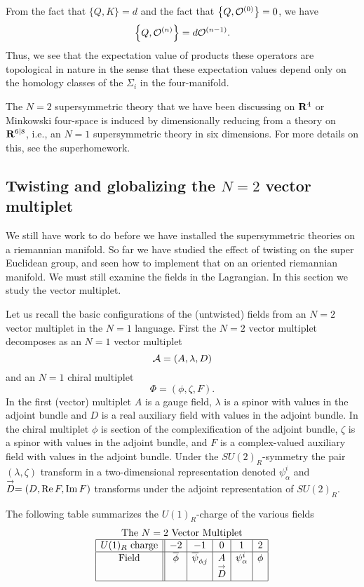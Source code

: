 \documentclass[10pt]{article}
\def\ov{\overline}
\begin{document}
{}From the fact that $\{Q,K\}=d$ and the fact that $\left\{Q,{\cal
O}^{(0)}\right\}=0$,  we have
$$\left\{Q,{\cal O}^{(n)}\right\}=d{\cal O}^{(n-1)}.$$
Thus, we see that the expectation value of
products these operators are topological in nature in the sense
that these expectation values 
depend only on the homology classes of the $\Sigma_i$ in the
four-manifold. 

The $N=2$ supersymmetric  theory that we have been discussing on ${\bf
R}^4$ or Minkowski four-space is induced by dimensionally reducing
from  a theory on ${\bf R}^{6|8}$, i.e., an $N=1$ supersymmetric
theory in six dimensions.  For more details on this, see the
superhomework. 


\subsection{Twisting and globalizing the $N=2$ vector multiplet}

We still have work to do before we have installed the supersymmetric
theories on a riemannian manifold.  So far we have studied the effect
of twisting on the super Euclidean group, and seen how to implement
that on an oriented riemannian manifold.  We must still examine the
fields in the Lagrangian. In this section we study the vector multiplet.


Let us recall the basic configurations of the (untwisted) fields from
an $N=2$ 
vector multiplet in the $N=1$ language. 
First the $N=2$ vector multiplet decomposes as an $N=1$ vector
multiplet 
$${\cal A}=(A,\lambda,D)$$
and an $N=1$ chiral multiplet 
$$\Phi=(\phi,\zeta,F).$$
In the first (vector) multiplet $A$ is a gauge field, $\lambda$ is a spinor
with values in the adjoint bundle and $D$ is a real
auxiliary field with values in the adjoint bundle.
In the chiral multiplet $\phi$ is section of the complexification of
the adjoint bundle, $\zeta$ is a spinor with values in the adjoint
bundle, and $F$ is a complex-valued auxiliary field with values in the
adjoint bundle.
Under the $SU(2)_R$-symmetry the pair $(\lambda,\zeta)$ transform in a
two-dimensional representation denoted $\psi_\alpha^i$ and $\buildrel
\rightarrow\over D = 
(D,{\rm Re}\,F,{\rm Im}\,F)$ transforms under the 
adjoint representation of $SU(2)_R$.

The following table summarizes the $U(1)_R$-charge of the various
fields
$$\begin{array}{|c||c|c|c|c|c|}
\multicolumn{6}{c} {{\rm The} \ N=2\ {\rm Vector\ Multiplet}} \\
\hline
U(1)_R\ {\rm charge} & -2 & -1 & 0 & 1 & 2 \\
\hline
{\rm Field} & \ov{\phi}  &  \ov{\psi}_{\dot\alpha j} & A &
\psi^i_\alpha & \phi \\ 
 & & & \buildrel\rightarrow\over D & & \\
\hline
\end{array}
$$
\end{document}
